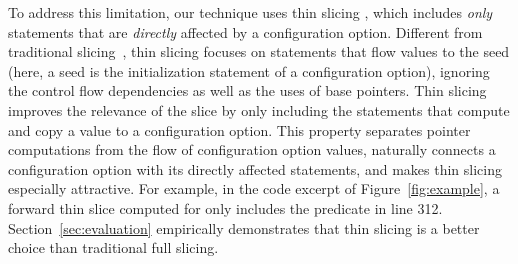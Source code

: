 

To address this limitation, our technique uses thin
slicing \cite{Sridharan:2007}, which includes
\textit{only} statements that are \textit{directly} affected by a configuration option.
Different from traditional slicing~\cite{Horwitz:1988}, thin slicing
focuses on statements that flow values to the seed (here, a
seed is the initialization statement of a configuration option), ignoring the 
control flow dependencies as well as the uses of
base pointers. Thin slicing improves the relevance
of the slice by only including the statements that compute
and copy a value to a configuration option.
This property separates
pointer computations from the flow of configuration option values,
naturally connects a configuration option with its
directly affected statements, and makes thin slicing
especially attractive.
For example, in the code excerpt of
Figure~\ref{fig:example},
a forward thin slice computed for 
only includes the predicate in line 312.
Section~\ref{sec:evaluation} 
empirically demonstrates that thin slicing
is a better choice than traditional full slicing.




% 

